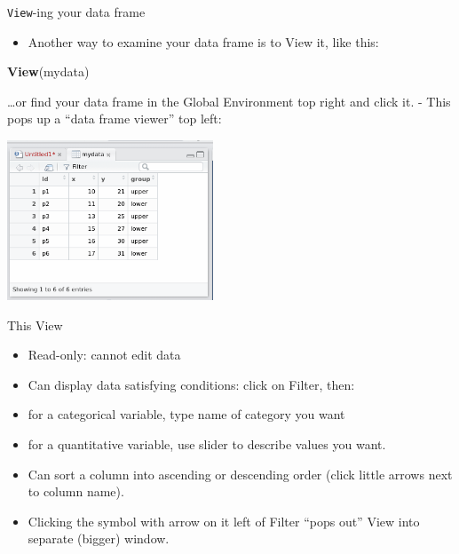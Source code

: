 \documentclass[ignorenonframetext,]{beamer}
\newenvironment{Shaded}{\begin{snugshade}}{\end{snugshade}}
\newcommand{\KeywordTok}[1]{\textcolor[rgb]{0.13,0.29,0.53}{\textbf{#1}}}
\newcommand{\NormalTok}[1]{#1}
\providecommand{\tightlist}{%
  \setlength{\itemsep}{0pt}\setlength{\parskip}{0pt}}
\begin{document}
\begin{frame}[fragile]{\texttt{View}-ing your data frame}
\protect\hypertarget{view-ing-your-data-frame}{}

\begin{itemize}
\tightlist
\item
  Another way to examine your data frame is to View it, like this:
\end{itemize}

\begin{Shaded}
\begin{Highlighting}[]
\KeywordTok{View}\NormalTok{(mydata)}
\end{Highlighting}
\end{Shaded}

\ldots{}or find your data frame in the Global Environment top right and
click it. - This pops up a ``data frame viewer'' top left:

\includegraphics[width=\textwidth,height=1.875in]{viewview.png}

\end{frame}

\begin{frame}{This View}
\protect\hypertarget{this-view}{}

\begin{itemize}
\tightlist
\item
  Read-only: cannot edit data
\item
  Can display data satisfying conditions: click on Filter, then:
\item
  for a categorical variable, type name of category you want
\item
  for a quantitative variable, use slider to describe values you want.
\item
  Can sort a column into ascending or descending order (click little
  arrows next to column name).
\item
  Clicking the symbol with arrow on it left of Filter ``pops out'' View
  into separate (bigger) window.
\end{itemize}

\end{frame}
\end{document}
